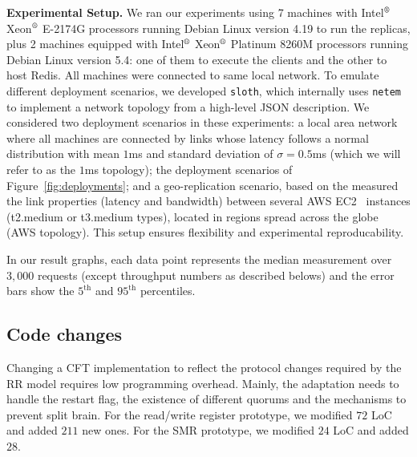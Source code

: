 \noindent \textbf{Experimental Setup.}
We ran our experiments using 7 machines  with
Intel$^\text{\textregistered}$ Xeon$^\text{\textregistered}$ E-2174G
processors running Debian Linux version 4.19 to run the replicas,
plus 2 machines equipped with Intel$^\text{\textregistered}$
Xeon$^\text{\textregistered}$ Platinum 8260M processors running Debian
Linux version 5.4: one of them to execute the clients and the other to
host Redis.
%
All machines were connected to same local network. To emulate
different deployment scenarios, we developed
\texttt{sloth}\cite{sloth}, which internally uses
\texttt{netem}\cite{netem} to implement a network topology from a
high-level JSON description. We considered two deployment
scenarios in these experiments: a local area network where all
machines are connected by links whose latency follows a normal
distribution with mean $1$ms and standard deviation of $\sigma =
0.5$ms (which we will refer to as the $1$ms topology); the
deployment scenarios of Figure~\ref{fig:deployments}; and a
geo-replication scenario, based on the measured the link
properties (latency and bandwidth) between several AWS
EC2~\cite{ec2} instances (t2.medium or t3.medium types), located
in regions spread across the globe (AWS topology). This setup
ensures flexibility and experimental reproducability.

In our result graphs, each data point represents the median
measurement over $3,000$ requests (except throughput numbers as
described belows) and the error bars show the $5^{\text{th}}$ and
$95^{\text{th}}$ percentiles.

\subsection{Code changes}\label{ssec:implementation_effort}

Changing a \ac{CFT} implementation to reflect the protocol changes
required by the \ac{RR} model requires low programming
overhead. Mainly, the adaptation needs to handle the restart
flag, the existence of different quorums and the mechanisms to
prevent split brain. For the read/write register prototype, we
modified $72$ LoC and added $211$ new ones. For the SMR
prototype, we modified $24$ LoC and added $28$.

